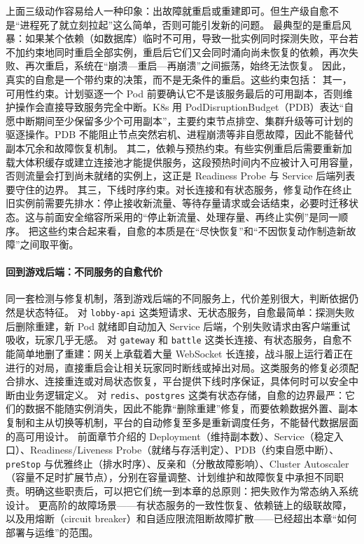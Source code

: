 上面三级动作容易给人一种印象：出故障就重启或重建即可。但生产级自愈不是“进程死了就立刻拉起”这么简单，否则可能引发新的问题。
最典型的是重启风暴：如果某个依赖（如数据库）临时不可用，导致一批实例同时探测失败，平台若不加约束地同时重启全部实例，重启后它们又会同时涌向尚未恢复的依赖，再次失败、再次重启，系统在“崩溃—重启—再崩溃”之间振荡，始终无法恢复。
因此，真实的自愈是一个带约束的决策，而不是无条件的重启。这些约束包括：
其一，可用性约束。计划驱逐一个 Pod 前要确认它不是该服务最后的可用副本，否则维护操作会直接导致服务完全中断。K8s 用 PodDisruptionBudget（PDB）表达“自愿中断期间至少保留多少个可用副本”，主要约束节点排空、集群升级等可计划的驱逐操作。PDB 不能阻止节点突然宕机、进程崩溃等非自愿故障，因此不能替代副本冗余和故障恢复机制。
其二，依赖与预热约束。有些实例重启后需要重新加载大体积缓存或建立连接池才能提供服务，这段预热时间内不应被计入可用容量，否则流量会打到尚未就绪的实例上，这正是 Readiness Probe 与 Service 后端列表要守住的边界。
其三，下线时序约束。对长连接和有状态服务，修复动作在终止旧实例前需要先排水：停止接收新流量、等待存量请求或会话结束，必要时迁移状态。这与前面安全缩容所采用的“停止新流量、处理存量、再终止实例”是同一顺序。
把这些约束合起来看，自愈的本质是在“尽快恢复”和“不因恢复动作制造新故障”之间取平衡。

\paragraph{回到游戏后端：不同服务的自愈代价}

同一套检测与修复机制，落到游戏后端的不同服务上，代价差别很大，判断依据仍然是状态特征。
对 \texttt{lobby-api} 这类短请求、无状态服务，自愈最简单：探测失败后删除重建，新 Pod 就绪即自动加入 Service 后端，个别失败请求由客户端重试吸收，玩家几乎无感。
对 \texttt{gateway} 和 \texttt{battle} 这类长连接、有状态服务，自愈不能简单地删了重建：网关上承载着大量 WebSocket 长连接，战斗服上运行着正在进行的对局，直接重启会让相关玩家同时断线或掉出对局。这类服务的修复必须配合排水、连接重连或对局状态恢复，平台提供下线时序保证，具体何时可以安全中断由业务逻辑定义。
对 \texttt{redis}、\texttt{postgres} 这类有状态存储，自愈的边界最严：它们的数据不能随实例消失，因此不能靠“删除重建”修复，而要依赖数据外置、副本复制和主从切换等机制，平台的自动修复至多是重新调度任务，不能替代数据层面的高可用设计。
前面章节介绍的 Deployment（维持副本数）、Service（稳定入口）、Readiness/Liveness Probe（就绪与存活判定）、PDB（约束自愿中断）、\texttt{preStop} 与优雅终止（排水时序）、反亲和（分散故障影响）、Cluster Autoscaler（容量不足时扩展节点），分别在容量调整、计划维护和故障恢复中承担不同职责。明确这些职责后，可以把它们统一到本章的总原则：把失败作为常态纳入系统设计。
更高阶的故障场景——有状态服务的一致性恢复、依赖链上的级联故障，以及用熔断（circuit breaker）和自适应限流阻断故障扩散——已经超出本章“如何部署与运维”的范围。

